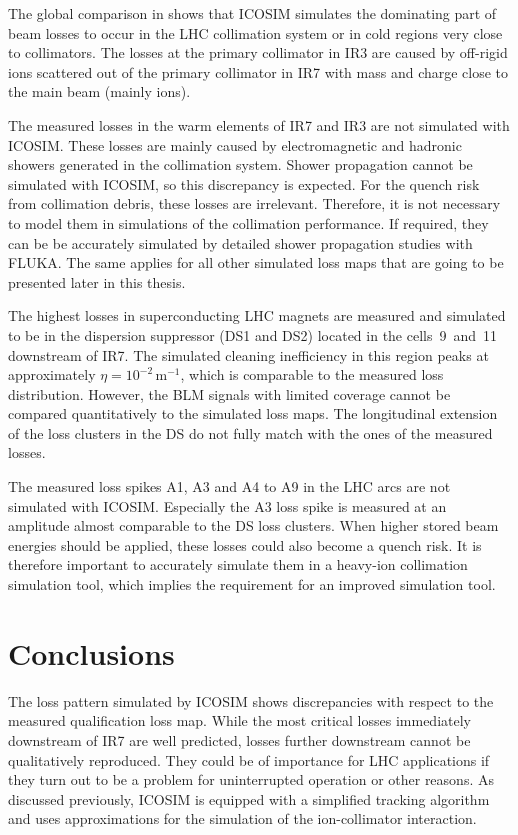 \newpage
The global comparison in  shows that ICOSIM simulates the dominating part of beam losses to occur in the LHC collimation system or in cold regions very close to collimators. The losses at the primary collimator in IR3 are caused by off-rigid ions scattered out of the primary collimator in IR7 with mass and charge close to the main beam (mainly  ions). 

The measured losses in the warm elements of IR7 and IR3 are not simulated with ICOSIM. These losses are mainly caused by electromagnetic and hadronic showers generated in the collimation system. Shower propagation cannot be simulated with ICOSIM, so this discrepancy is expected. For the quench risk from collimation debris, these losses are irrelevant. Therefore, it is not necessary to model them in simulations of the collimation performance. If required, they can be be accurately simulated by detailed shower propagation studies with FLUKA. The same applies for all other simulated loss maps that are going to be presented later in this thesis. 

The highest losses in superconducting LHC magnets are measured and simulated to be in the dispersion suppressor (DS1 and DS2) located in the \mbox{cells 9 and 11} downstream of IR7. The simulated cleaning inefficiency in this region peaks at approximately $\eta =10^{-2} \, \text{m}^{-1}$, which is comparable to the measured loss distribution. However, the BLM signals with limited coverage cannot be compared quantitatively to the simulated loss maps. The longitudinal extension of the loss clusters in the DS do not fully match with the ones of the measured losses. 

The measured loss spikes A1, A3 and A4 to A9 in the LHC arcs are not simulated with ICOSIM. Especially the A3 loss spike is measured at an amplitude almost comparable to the DS loss clusters. When higher stored beam energies should be applied, these losses could also become a quench risk. It is therefore important to accurately simulate them in a heavy-ion collimation simulation tool, which implies the requirement for an improved simulation tool.


 

\section{Conclusions} 

The loss pattern simulated by ICOSIM shows discrepancies with respect to the measured qualification loss map. While the most critical losses immediately downstream of IR7 are well predicted, losses further downstream cannot be qualitatively reproduced. They could be of importance for LHC applications if they turn out to be a problem for uninterrupted operation or other reasons. As discussed previously, ICOSIM is equipped with a simplified tracking algorithm and uses approximations for the simulation of the ion-collimator interaction. 

